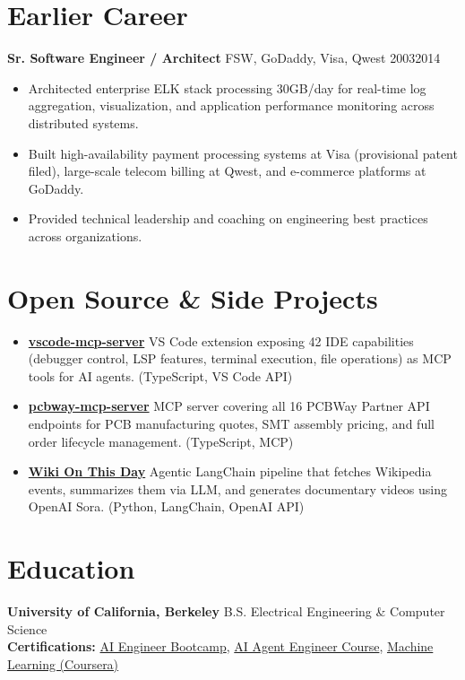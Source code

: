 \documentclass[11pt,letterpaper]{article}
\begin{document}
\section*{Earlier Career}
\textbf{Sr. Software Engineer / Architect} \hfill FSW, GoDaddy, Visa, Qwest \hfill 2003\textendash{}2014
\begin{itemize}
  \item Architected enterprise ELK stack processing 30GB/day for real-time log aggregation, visualization, and application performance monitoring across distributed systems.
  \item Built high-availability payment processing systems at Visa (provisional patent filed), large-scale telecom billing at Qwest, and e-commerce platforms at GoDaddy.
  \item Provided technical leadership and coaching on engineering best practices across organizations.
\end{itemize}

\section*{Open Source \& Side Projects}
\begin{itemize}
  \item \href{https://github.com/nabheet/vscode-mcp-server}{\textbf{vscode-mcp-server}} \textendash{} VS Code extension exposing 42 IDE capabilities (debugger control, LSP features, terminal execution, file operations) as MCP tools for AI agents. (TypeScript, VS Code API)
  \item \href{https://github.com/nabheet/pcbway-mcp-server}{\textbf{pcbway-mcp-server}} \textendash{} MCP server covering all 16 PCBWay Partner API endpoints for PCB manufacturing quotes, SMT assembly pricing, and full order lifecycle management. (TypeScript, MCP)
  \item \href{https://github.com/nabheet/wiki-on-this-day}{\textbf{Wiki On This Day}} \textendash{} Agentic LangChain pipeline that fetches Wikipedia events, summarizes them via LLM, and generates documentary videos using OpenAI Sora. (Python, LangChain, OpenAI API)
\end{itemize}

\section*{Education}
\textbf{University of California, Berkeley} \hfill B.S. Electrical Engineering \& Computer Science \\
\textbf{Certifications:} \href{https://www.udemy.com/certificate/UC-139cb69e-ff24-4de2-8889-df32f999fa21/}{AI Engineer Bootcamp}, \href{https://www.udemy.com/certificate/UC-835d16d0-903f-4afd-8f66-6d6da2ff75c3/}{AI Agent Engineer Course}, \href{https://www.coursera.org/account/accomplishments/verify/AP4AX6F6X5HR}{Machine Learning (Coursera)}
\end{document}
